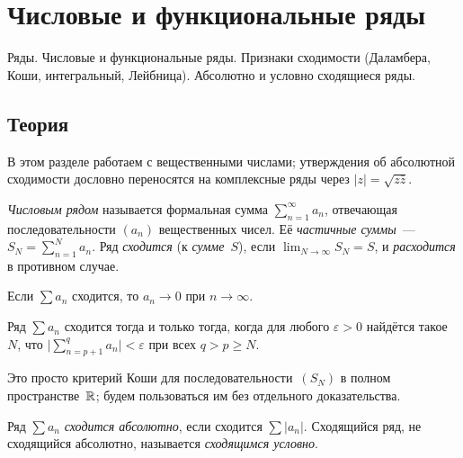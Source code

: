 
\section{Числовые и функциональные ряды}
\label{sec:1.1.08-series}

\begin{ticket}
Ряды. Числовые и функциональные ряды. Признаки сходимости (Даламбера, Коши, интегральный, Лейбница). Абсолютно и условно сходящиеся ряды.
\end{ticket}

\subsection*{Теория}

В этом разделе работаем с вещественными числами; утверждения об
абсолютной сходимости дословно переносятся на комплексные ряды через
$|z| = \sqrt{z\bar{z}}$.

\begin{definition}
\label{def:series-convergence}
\emph{Числовым рядом} называется формальная сумма
$\sum_{n=1}^{\infty} a_n$, отвечающая последовательности $(a_n)$
вещественных чисел. Её \emph{частичные суммы}~---
$S_N = \sum_{n=1}^{N} a_n$. Ряд \emph{сходится} (к \emph{сумме}~$S$),
если $\lim_{N \to \infty} S_N = S$, и \emph{расходится} в противном
случае.
\end{definition}

\begin{proposition}
\label{prop:necessary}
Если $\sum a_n$ сходится, то $a_n \to 0$ при $n \to \infty$.
\end{proposition}

\begin{theorem}
\label{thm:series-cauchy}
Ряд $\sum a_n$ сходится тогда и только тогда, когда для любого
$\varepsilon > 0$ найдётся такое~$N$, что
$\bigl|\sum_{n=p+1}^{q} a_n\bigr| < \varepsilon$ при всех $q > p \ge N$.
\end{theorem}

Это просто критерий Коши для последовательности~$(S_N)$ в полном
пространстве~$\mathbb{R}$; будем пользоваться им без отдельного доказательства.

\begin{definition}
\label{def:abs-cond-convergence}
Ряд $\sum a_n$ \emph{сходится абсолютно}, если сходится $\sum |a_n|$.
Сходящийся ряд, не сходящийся абсолютно, называется \emph{сходящимся
условно}.
\end{definition}

